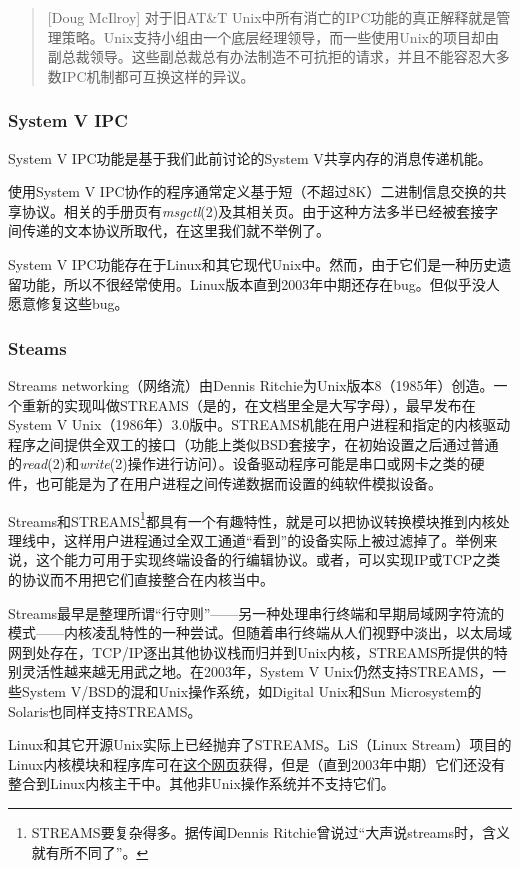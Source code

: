 \documentclass[12pt,oneside]{ctexbook}
\begin{document}
\begin{common-format}
\begin{quote}[Doug McIlroy]
对于旧AT\&{}T Unix中所有消亡的IPC功能的真正解释就是管理策略。Unix支持小组由一个底层经理领导，而一些使用Unix的项目却由副总裁领导。这些副总裁总有办法制造不可抗拒的请求，并且不能容忍大多数IPC机制都可互换这样的异议。
\end{quote}

\subsubsection{System V IPC}
System V IPC功能是基于我们此前讨论的System V共享内存的消息传递机能。

使用System V IPC协作的程序通常定义基于短（不超过8K）二进制信息交换的共享协议。相关的手册页有\textit{msgctl}(2)及其相关页。由于这种方法多半已经被套接字间传递的文本协议所取代，在这里我们就不举例了。

System V IPC功能存在于Linux和其它现代Unix中。然而，由于它们是一种历史遗留功能，所以不很经常使用。Linux版本直到2003年中期还存在bug。但似乎没人愿意修复这些bug。


\subsubsection{Steams}
Streams networking（网络流）由Dennis Ritchie为Unix版本8（1985年）创造。一个重新的实现叫做STREAMS（是的，在文档里全是大写字母），最早发布在System V Unix（1986年）3.0版中。STREAMS机能在用户进程和指定的内核驱动程序之间提供全双工的接口（功能上类似BSD套接字，在初始设置之后通过普通的\textit{read}(2)和\textit{write}(2)操作进行访问）。设备驱动程序可能是串口或网卡之类的硬件，也可能是为了在用户进程之间传递数据而设置的纯软件模拟设备。

Streams和STREAMS\footnote{STREAMS要复杂得多。据传闻Dennis Ritchie曾说过“大声说streams时，含义就有所不同了”。}都具有一个有趣特性，就是可以把协议转换模块推到内核处理线中，这样用户进程通过全双工通道“看到”的设备实际上被过滤掉了。举例来说，这个能力可用于实现终端设备的行编辑协议。或者，可以实现IP或TCP之类的协议而不用把它们直接整合在内核当中。

Streams最早是整理所谓“行守则”——另一种处理串行终端和早期局域网字符流的模式——内核凌乱特性的一种尝试。但随着串行终端从人们视野中淡出，以太局域网到处存在，TCP/IP逐出其他协议栈而归并到Unix内核，STREAMS所提供的特别灵活性越来越无用武之地。在2003年，System V Unix仍然支持STREAMS，一些System V/BSD的混和Unix操作系统，如Digital Unix和Sun Microsystem的Solaris也同样支持STREAMS。

Linux和其它开源Unix实际上已经抛弃了STREAMS。LiS（Linux Stream）项目的Linux内核模块和程序库可在\href{http://www.gcom.com/home/linux/lis/}{这个网页}获得，但是（直到2003年中期）它们还没有整合到Linux内核主干中。其他非Unix操作系统并不支持它们。



\end{common-format}
\end{document}
